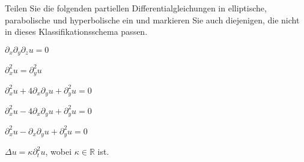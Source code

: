 Teilen Sie die folgenden partiellen Differentialgleichungen
in elliptische, parabolische und hyperbolische ein und markieren
Sie auch diejenigen, die nicht in dieses Klassifikationsschema passen.
\begin{teilaufgaben}
\item $\partial_x\partial_y\partial_z u=0$
\item $\partial_x^2u=\partial_y^2u$
\item $\partial_x^2u+4\partial_x\partial_yu+\partial_y^2u=0$
\item $\partial_x^2u-4\partial_x\partial_yu+\partial_y^2u=0$
\item $\partial_x^2u-\partial_x\partial_yu+\partial_y^2u=0$
\item $\Delta u=\kappa\partial_t^2u$, wobei $\kappa\in \mathbb R$ ist.
\end{teilaufgaben}


